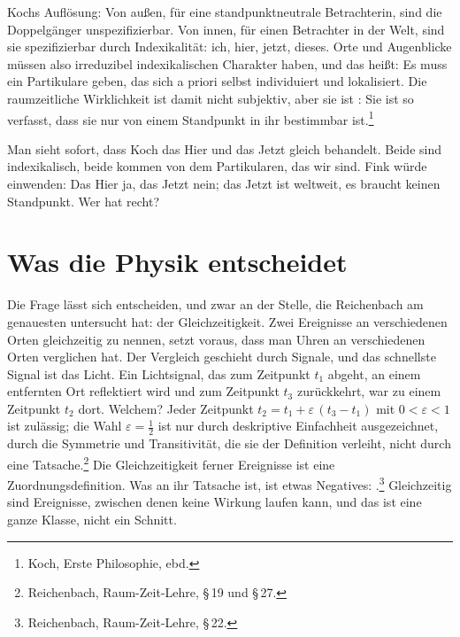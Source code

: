 Kochs Auflösung: Von außen, für eine standpunktneutrale Betrachterin, sind die Doppelgänger unspezifizierbar. Von innen, für einen Betrachter in der Welt, sind sie spezifizierbar durch Indexikalität: ich, hier, jetzt, dieses. Orte und Augenblicke müssen also irreduzibel indexikalischen Charakter haben, und das heißt: Es muss ein Partikulare geben, das sich a priori selbst individuiert und lokalisiert.  Die raumzeitliche Wirklichkeit ist damit nicht subjektiv, aber sie ist : Sie ist so verfasst, dass sie nur von einem Standpunkt in ihr bestimmbar ist.\footnote{Koch, Erste Philosophie, ebd.}

Man sieht sofort, dass Koch das Hier und das Jetzt gleich behandelt. Beide sind indexikalisch, beide kommen von dem Partikularen, das wir sind. Fink würde einwenden: Das Hier ja, das Jetzt nein; das Jetzt ist weltweit, es braucht keinen Standpunkt. Wer hat recht?

\section{Was die Physik entscheidet}

Die Frage lässt sich entscheiden, und zwar an der Stelle, die Reichenbach am genauesten untersucht hat: der Gleichzeitigkeit. Zwei Ereignisse an verschiedenen Orten gleichzeitig zu nennen, setzt voraus, dass man Uhren an verschiedenen Orten verglichen hat. Der Vergleich geschieht durch Signale, und das schnellste Signal ist das Licht. Ein Lichtsignal, das zum Zeitpunkt $t_1$ abgeht, an einem entfernten Ort reflektiert wird und zum Zeitpunkt $t_3$ zurückkehrt, war zu einem Zeitpunkt $t_2$ dort. Welchem? Jeder Zeitpunkt $t_2 = t_1 + \varepsilon\,(t_3 - t_1)$ mit $0 < \varepsilon < 1$ ist zulässig; die Wahl $\varepsilon = \tfrac12$ ist nur durch deskriptive Einfachheit ausgezeichnet, durch die Symmetrie und Transitivität, die sie der Definition verleiht, nicht durch eine Tatsache.\footnote{Reichenbach, Raum-Zeit-Lehre, \S\,19 und \S\,27.} Die Gleichzeitigkeit ferner Ereignisse ist eine Zuordnungsdefinition. Was an ihr Tatsache ist, ist etwas Negatives: .\footnote{Reichenbach, Raum-Zeit-Lehre, \S\,22.} Gleichzeitig sind Ereignisse, zwischen denen keine Wirkung laufen kann, und das ist eine ganze Klasse, nicht ein Schnitt.

